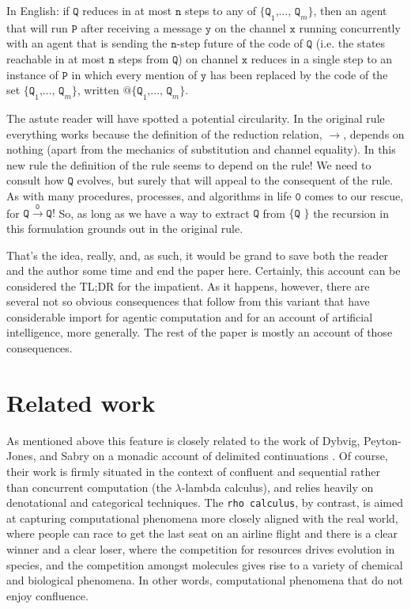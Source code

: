 \documentclass{article}
\newcommand{\code}[1]{\texttt{#1}}
\begin{document}
In English: if $\code{Q}$ reduces in at most $\code{n}$ steps to any of $\code{\{ Q}_1\code{,} \ldots\code{, Q}_m \code{\}}$, then an agent that will run $\code{P}$ after receiving a message $\code{y}$ on the channel $\code{x}$ running concurrently with an agent that is sending the $\code{n}$-step future of the code of $\code{Q}$ (i.e. the states reachable in at most $\code{n}$ steps from $\code{Q}$) on channel $\code{x}$ reduces in a single step to an instance of $\code{P}$ in which every mention of $\code{y}$ has been replaced by the code of the set $\code{\{ Q}_1\code{,} \ldots\code{, Q}_m \code{\}}$, written $\code{@\{ Q}_1\code{,} \dots\code{, Q}_m \code{\}}$.

\medskip

The astute reader will have spotted a potential circularity. In the original rule everything works because the definition of the reduction relation, $\rightarrow$, depends on nothing (apart from the mechanics of substitution and channel equality). In this new rule the definition of the rule seems to depend on the rule! We need to consult how $\code{Q}$ evolves, but surely that will appeal to the consequent of the rule. As with many procedures, processes, and algorithms in life $\code{0}$ comes to our rescue, for $\code{Q} \xrightarrow{\code{0}} \code{Q}!$ So, as long as we have a way to extract $\code{Q}$ from $\code{\{ Q \}}$ the recursion in this formulation grounds out in the original rule.

\medskip

That's the idea, really, and, as such, it would be grand to save both the reader and the author some time and end the paper here. Certainly, this account can be considered the TL;DR for the impatient. As it happens, however, there are several not so obvious consequences that follow from this variant that have considerable import for agentic computation and for an account of artificial intelligence, more generally. The rest of the paper is mostly an account of those consequences.

\section{Related work}

As mentioned above this feature is closely related to the work of Dybvig, Peyton-Jones, and Sabry on a monadic account of delimited continuations \cite{DBLP:journals/jfp/DybvigJS07}. Of course, their work is firmly situated in the context of confluent and sequential rather than concurrent computation (the $\lambda$-lambda calculus), and relies heavily on denotational and categorical techniques. The \code{rho calculus}, by contrast, is aimed at capturing computational phenomena more closely aligned with the real world, where people can race to get the last seat on an airline flight and there is a clear winner and a clear loser, where the competition for resources drives evolution in species, and the competition amongst molecules gives rise to a variety of chemical and biological phenomena. In other words, computational phenomena that do not enjoy confluence.
\end{document}

